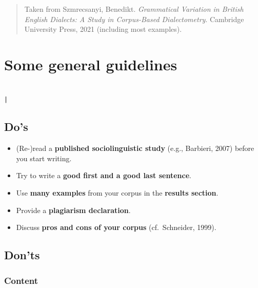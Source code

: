 \documentclass[
  11pt,
  letterpaper,
  DIV=11,
  numbers=noendperiod]{scrreprt}
\providecommand{\tightlist}{%
  \setlength{\itemsep}{0pt}\setlength{\parskip}{0pt}}\usepackage{longtable,booktabs,array}
\begin{document}
\begin{quote}
Taken from Szmrecsanyi, Benedikt. \emph{Grammatical Variation in British
English Dialects: A Study in Corpus-Based Dialectometry}. Cambridge
University Press, 2021 (including most examples).
\end{quote}

\chapter{Some general guidelines}\label{some-general-guidelines}

\begin{verbatim}
                                                                                               |
\end{verbatim}

\section{Do's}\label{dos}

\begin{itemize}
\tightlist
\item
  (Re-)read a \textbf{published sociolinguistic study} (e.g., Barbieri,
  2007) before you start writing.
\item
  Try to write a \textbf{good first and a good last sentence}.
\item
  Use \textbf{many examples} from your corpus in the \textbf{results
  section}.
\item
  Provide a \textbf{plagiarism declaration}.
\item
  Discuss \textbf{pros and cons of your corpus} (cf.~Schneider, 1999).
\end{itemize}

\section{Don'ts}\label{donts}

\subsection{Content}\label{content}
\end{document}
